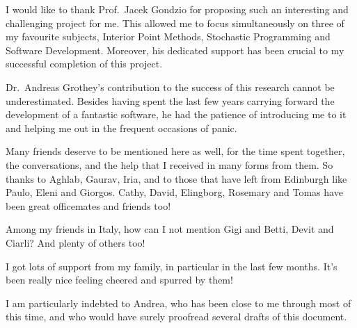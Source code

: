 
%
%

I would like to thank Prof.~Jacek Gondzio for proposing such an interesting and challenging project for me. This allowed me to focus simultaneously on three of my  favourite subjects, Interior Point Methods, Stochastic Programming and Software Development. Moreover, his dedicated support has been crucial to my successful completion of this project.

Dr.~Andreas Grothey's contribution to the success of this research cannot be underestimated. Besides having spent the last few years carrying forward the development of a fantastic software, he had the patience of introducing me to it and helping me out in the frequent occasions of panic.

Many friends deserve to be mentioned here as well, for the time spent together, the conversations, and the help that I received in many forms from them. So thanks to Aghlab, Gaurav, Iria, and to those that have left from Edinburgh like Paulo, Eleni and Giorgos. Cathy, David, Elingborg, Rosemary and Tomas have been great officemates and friends too!

Among my friends in Italy, how can I not mention Gigi and Betti, Devit and Ciarli? And plenty of others too!

I got lots of support from my family, in particular in the last few months. It's been really nice feeling cheered and spurred by them!

I am particularly indebted to Andrea, who has been close to me through most of this time, and who would have surely proofread several drafts of this document.
